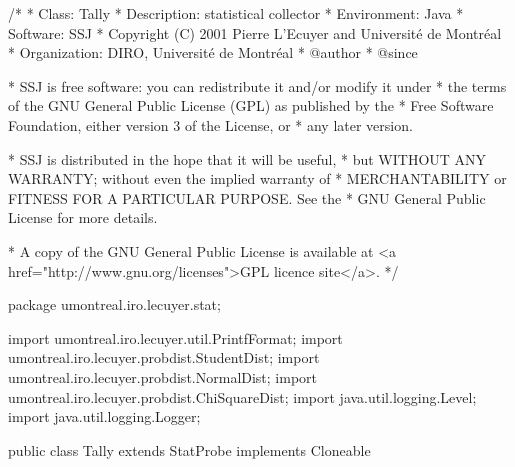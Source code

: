 \begin{code}
\begin{hide}
/*
 * Class:        Tally
 * Description:  statistical collector 
 * Environment:  Java
 * Software:     SSJ 
 * Copyright (C) 2001  Pierre L'Ecuyer and Université de Montréal
 * Organization: DIRO, Université de Montréal
 * @author       
 * @since

 * SSJ is free software: you can redistribute it and/or modify it under
 * the terms of the GNU General Public License (GPL) as published by the
 * Free Software Foundation, either version 3 of the License, or
 * any later version.

 * SSJ is distributed in the hope that it will be useful,
 * but WITHOUT ANY WARRANTY; without even the implied warranty of
 * MERCHANTABILITY or FITNESS FOR A PARTICULAR PURPOSE.  See the
 * GNU General Public License for more details.

 * A copy of the GNU General Public License is available at
   <a href="http://www.gnu.org/licenses">GPL licence site</a>.
 */
\end{hide}
package umontreal.iro.lecuyer.stat;
\begin{hide}
import umontreal.iro.lecuyer.util.PrintfFormat;
import umontreal.iro.lecuyer.probdist.StudentDist;
import umontreal.iro.lecuyer.probdist.NormalDist;
import umontreal.iro.lecuyer.probdist.ChiSquareDist;
import java.util.logging.Level;
import java.util.logging.Logger;
\end{hide}

public class Tally extends StatProbe implements Cloneable\begin{hide} {
   private int numObs;
   private double sumSquares;
   private final boolean isStable = true;  // = true: use a numerically stable
                                   // form for the average and the variance.
                                   // = false: use the old unstable forms.
   private double curAverage;  // The average of the first numObs observations
   private double curSum2;     // The sum (xi - average)^2 of the first numObs
                               // observations.
   private Logger log = Logger.getLogger ("umontreal.iro.lecuyer.stat");

   private static enum CIType {CI_NONE, CI_NORMAL, CI_STUDENT};

   protected CIType confidenceInterval = CIType.CI_NONE;
   protected double level = 0.95;
   protected int digits = 3;
\end{hide}
\end{code}

